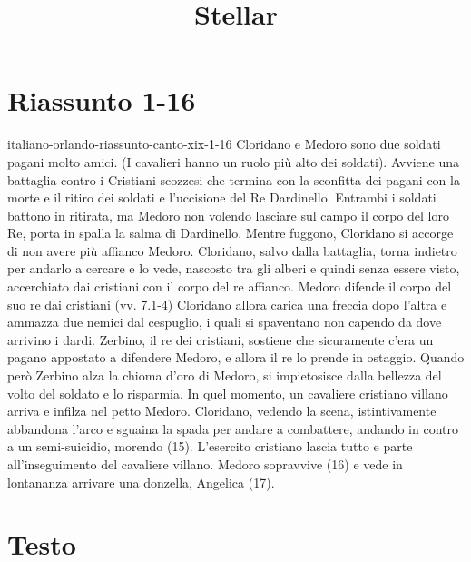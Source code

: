 \documentclass[preview]{standalone}
\begin{document}
\title{Stellar}
\genpage

\section{Riassunto 1-16}

\begin{snippet}{italiano-orlando-riassunto-canto-xix-1-16}
    Cloridano e Medoro sono due soldati pagani molto amici. (I cavalieri hanno un ruolo più alto dei soldati).
    Avviene una battaglia contro i Cristiani scozzesi che termina con la sconfitta dei pagani con la morte e il ritiro dei soldati e l'uccisione del Re Dardinello.
    Entrambi i soldati battono in ritirata, ma Medoro non volendo lasciare sul campo il corpo del loro Re, porta in spalla la salma di Dardinello.
    Mentre fuggono, Cloridano si accorge di non avere più affianco Medoro.
    Cloridano, salvo dalla battaglia, torna indietro per andarlo a cercare e lo vede, nascosto tra gli alberi e quindi senza essere visto, accerchiato dai cristiani con il corpo del re affianco.
    Medoro difende il corpo del suo re dai cristiani  (vv. 7.1-4)
    Cloridano allora carica una freccia dopo l'altra e ammazza due nemici dal cespuglio, i quali si spaventano non capendo da dove arrivino i dardi.
    Zerbino, il re dei cristiani, sostiene che sicuramente c'era un pagano appostato a difendere Medoro, e allora il re lo prende in ostaggio.
    Quando però Zerbino alza la chioma d'oro di Medoro, si impietosisce dalla bellezza del volto del soldato e lo risparmia.
    In quel momento, un cavaliere cristiano villano arriva e infilza nel petto Medoro.
    Cloridano, vedendo la scena, istintivamente abbandona l'arco e sguaina la spada per andare a combattere, andando in contro a un semi-suicidio, morendo (15).
    L'esercito cristiano lascia tutto e parte all'inseguimento del cavaliere villano.
    Medoro sopravvive (16) e vede in lontananza arrivare una donzella, Angelica (17).
\end{snippet}

\section{Testo}
\end{document}
